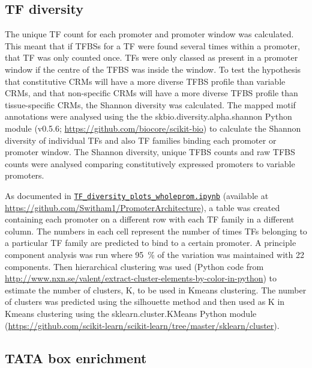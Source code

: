 \documentclass[../main.tex]{subfiles}
\begin{document}
\subsection{TF diversity}\label{chapter2:methods:tf-diversity}

The unique TF count for each promoter and promoter window was calculated. This meant that if TFBSs for a TF were found several times within a promoter, that TF was only counted once.
TFs were only classed as present in a promoter window if the centre of the TFBS was inside the window.
To test the hypothesis that constitutive CRMs will have a more diverse TFBS profile than variable CRMs, and that non\hyp{}specific CRMs will have a more diverse TFBS profile than tissue\hyp{}specific CRMs, the Shannon diversity was calculated.
The mapped motif annotations were analysed using the the skbio.diversity.alpha.shannon Python module (v0.5.6; \url{https://github.com/biocore/scikit-bio}) to calculate the Shannon diversity of individual TFs and also TF families binding each promoter or promoter window.
The Shannon diversity, unique TFBS counts and raw TFBS counts were analysed comparing constitutively expressed promoters to variable promoters.

As documented in \href{https://github.com/Switham1/PromoterArchitecture/blob/master/src/plotting/TF_diversity_plots_wholeprom.ipynb}{\texttt{TF\_diversity\_plots\_wholeprom.ipynb}} (available at \url{https://github.com/Switham1/PromoterArchitecture}), a table was created containing each promoter on a different row with each TF family in a different column.
The numbers in each cell represent the number of times TFs belonging to a particular TF family are predicted to bind to a certain promoter.
A principle component analysis was run where \SI{95}{\percent} of the variation was maintained with 22 components.
Then hierarchical clustering was used (Python code from \url{http://www.nxn.se/valent/extract-cluster-elements-by-color-in-python}) to estimate the number of clusters, K, to be used in Kmeans clustering.
The number of clusters was predicted using the silhouette method \autocite{rousseeuwSilhouettesGraphicalAid1987} and then used as K in Kmeans clustering using the sklearn.cluster.KMeans Python module (\url{https://github.com/scikit-learn/scikit-learn/tree/master/sklearn/cluster}).

\subsection{TATA box enrichment}\label{chapter2:methods:tata-box-enrichment}
\end{document}
